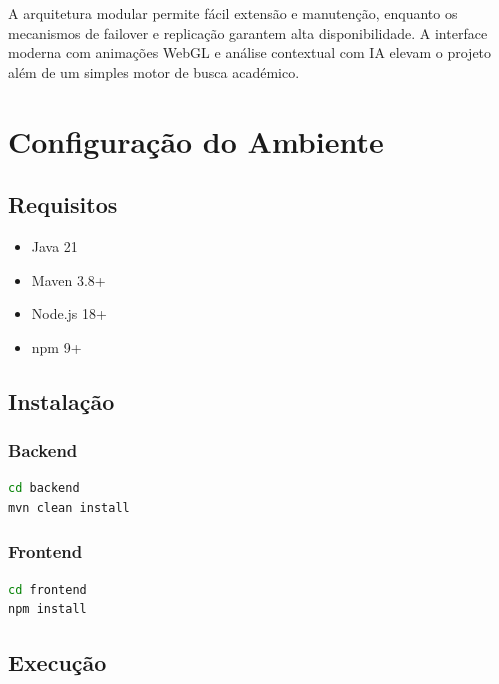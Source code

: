 \documentclass[12pt,a4paper]{article}
\begin{document}
A arquitetura modular permite fácil extensão e manutenção, enquanto os mecanismos de failover e replicação garantem alta disponibilidade. A interface moderna com animações WebGL e análise contextual com IA elevam o projeto além de um simples motor de busca académico.

\newpage



\appendix

\section{Configuração do Ambiente}

\subsection{Requisitos}
\begin{itemize}
    \item Java 21
    \item Maven 3.8+
    \item Node.js 18+
    \item npm 9+
\end{itemize}

\subsection{Instalação}

\subsubsection{Backend}
\begin{lstlisting}[language=bash]
cd backend
mvn clean install
\end{lstlisting}

\subsubsection{Frontend}
\begin{lstlisting}[language=bash]
cd frontend
npm install
\end{lstlisting}

\subsection{Execução}
\end{document}
